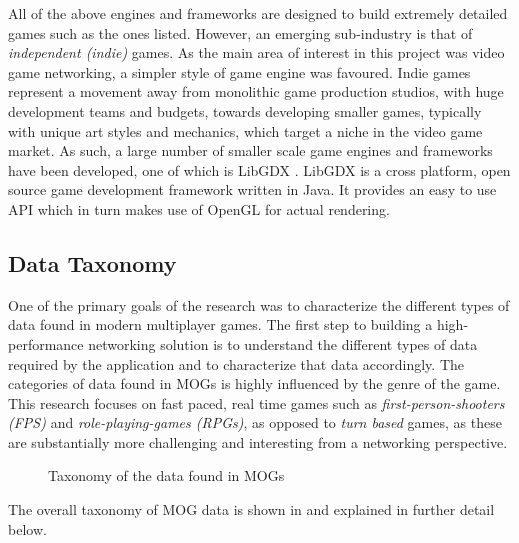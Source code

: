 All of the above engines and frameworks are designed to build extremely detailed games such as the ones listed. However, an emerging sub-industry is that of \textit{independent (indie)} games. As the main area of interest in this project was video game networking, a simpler style of game engine was favoured. Indie games represent a movement away from monolithic game production studios, with huge development teams and budgets, towards developing smaller games, typically with unique art styles and mechanics, which target a niche in the video game market. As such, a large number of smaller scale game engines and frameworks have been developed, one of which is LibGDX \cite{libgdx}. LibGDX is a cross platform, open source game development framework written in Java. It provides an easy to use API which in turn makes use of OpenGL for actual rendering. 

\subsection{Data Taxonomy}\label{sec:taxonomy}
One of the primary goals of the research was to characterize the different types of data found in modern multiplayer games. The first step to building a high-performance networking solution is to understand the different types of data required by the application and to characterize that data accordingly. The categories of data found in MOGs is highly influenced by the genre of the game. This research focuses on fast paced, real time games such as \textit{first-person-shooters (FPS)} and \textit{role-playing-games (RPGs)}, as opposed to \textit{turn based} games, as these are substantially more challenging and interesting from a networking perspective. 

\begin{figure}[H]
    \centering
    \caption{Taxonomy of the data found in MOGs}
    \label{fig:taxonomy}
\end{figure}


The overall taxonomy of MOG data is shown in  and explained in further detail below.

